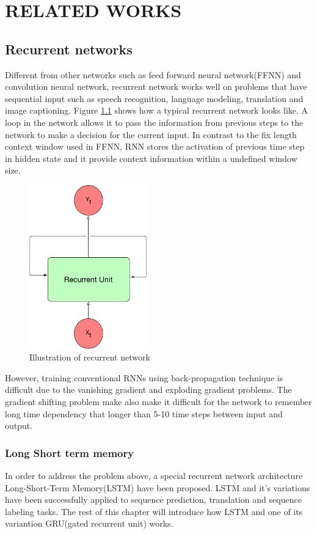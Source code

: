 \chapter{RELATED WORKS}
	\label{CH_02}


\section{Recurrent networks}
Different from other networks such as feed forward neural network(FFNN) and convolution neural network, recurrent network works well on problems that have sequential input such as speech recognition, language modeling, translation and image captioning. Figure \ref{fig:0} shows how a typical recurrent network looks like. A loop in the network allows it to pass the information from previous steps to the network to make a decision for the current input. In contrast to the fix length context window used in FFNN, RNN stores the activation of previous time step in hidden state and it provide context information within a undefined window size.

\begin{figure}[h] 
	\centering
	\includegraphics[width=2.0in]{Figures/recurrent1}
	\caption[recurrent network]{Illustration of recurrent network}
	\label{fig:0}
\end{figure}

However, training conventional RNNs using back-propagation technique is difficult due to the vanishing gradient and exploding gradient problems\cite{bengio1994learning}. The gradient shifting problem make
also make it difficult for the network to remember long time dependency that longer than 5-10 time steps between input and output.
\subsection{Long Short term memory}
In order to address the problem above, a special recurrent network architecture Long-Short-Term Memory(LSTM) have been proposed\cite{hochreiter1997long}. LSTM and it's variations have been successfully applied to sequence prediction, translation and sequence labeling tasks. The rest of this chapter will introduce how LSTM and one of its variantion GRU(gated recurrent unit) works.\par

